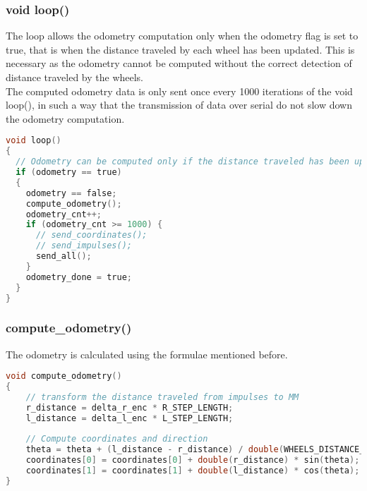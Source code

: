 \subsubsection{void loop()}
The loop allows the odometry computation only when the odometry flag is set to true, that is when the distance traveled by each wheel has been updated. This is necessary as the odometry cannot be computed 
without the correct detection of distance traveled by the wheels.
\\
The computed odometry data is only sent once every 1000 iterations of the void loop(), in such a way that the transmission of data over serial do not slow down the odometry computation.

\begin{lstlisting}[language=C]
void loop()
{
  // Odometry can be computed only if the distance traveled has been updated
  if (odometry == true)
  {
    odometry == false;
    compute_odometry();
    odometry_cnt++;
    if (odometry_cnt >= 1000) {
      // send_coordinates();
      // send_impulses();
      send_all();
    }
    odometry_done = true;
  }
}
\end{lstlisting}


\subsubsection{compute\_odometry()}
The odometry is calculated using the formulae mentioned before.

\begin{lstlisting}[language=C]
void compute_odometry()
{
    // transform the distance traveled from impulses to MM
    r_distance = delta_r_enc * R_STEP_LENGTH;
    l_distance = delta_l_enc * L_STEP_LENGTH;
      
    // Compute coordinates and direction
    theta = theta + (l_distance - r_distance) / double(WHEELS_DISTANCE_MM);
    coordinates[0] = coordinates[0] + double(r_distance) * sin(theta);
    coordinates[1] = coordinates[1] + double(l_distance) * cos(theta);
}
\end{lstlisting}


